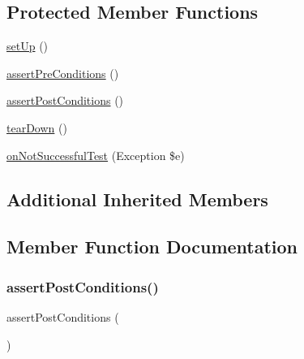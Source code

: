 \subsection*{Protected Member Functions}
\begin{DoxyCompactItemize}
\item 
\mbox{\hyperlink{class_template_methods_test_a0bc688732d2b3b162ffebaf7812e78da}{set\+Up}} ()
\item 
\mbox{\hyperlink{class_template_methods_test_ad6402f56c691a56954229b7e6a2294aa}{assert\+Pre\+Conditions}} ()
\item 
\mbox{\hyperlink{class_template_methods_test_abf54422376f10d9cbe49a06676e39e86}{assert\+Post\+Conditions}} ()
\item 
\mbox{\hyperlink{class_template_methods_test_a80fe3d17e658907fc75346a0ec9d6fc7}{tear\+Down}} ()
\item 
\mbox{\hyperlink{class_template_methods_test_ad52d89ed0d081f2259d9ca6e398e2d3d}{on\+Not\+Successful\+Test}} (Exception \$e)
\end{DoxyCompactItemize}
\subsection*{Additional Inherited Members}


\subsection{Member Function Documentation}
\mbox{\label{class_template_methods_test_abf54422376f10d9cbe49a06676e39e86}} 
\subsubsection{\texorpdfstring{assert\+Post\+Conditions()}{assertPostConditions()}}
{\footnotesize\ttfamily assert\+Post\+Conditions (\begin{DoxyParamCaption}{ }\end{DoxyParamCaption})\hspace{0.3cm}{\ttfamily [protected]}}

\mbox{\label{class_template_methods_test_ad6402f56c691a56954229b7e6a2294aa}} 
